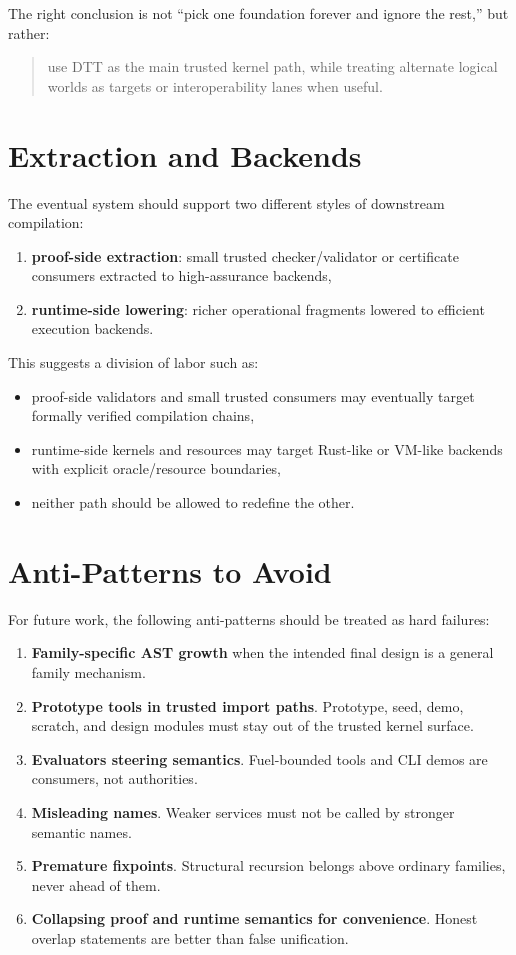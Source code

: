 \documentclass[11pt]{article}
\begin{document}
The right conclusion is not ``pick one foundation forever and ignore the rest,'' but rather:
\begin{quote}
use DTT as the main trusted kernel path, while treating alternate logical worlds as targets or interoperability lanes when useful.
\end{quote}

\section{Extraction and Backends}
The eventual system should support two different styles of downstream compilation:
\begin{enumerate}[label=(\roman*)]
  \item \textbf{proof-side extraction}: small trusted checker/validator or certificate consumers extracted to high-assurance backends,
  \item \textbf{runtime-side lowering}: richer operational fragments lowered to efficient execution backends.
\end{enumerate}

This suggests a division of labor such as:
\begin{itemize}
  \item proof-side validators and small trusted consumers may eventually target formally verified compilation chains,
  \item runtime-side kernels and resources may target Rust-like or VM-like backends with explicit oracle/resource boundaries,
  \item neither path should be allowed to redefine the other.
\end{itemize}

\section{Anti-Patterns to Avoid}
For future work, the following anti-patterns should be treated as hard failures:
\begin{enumerate}[label=(\arabic*)]
  \item \textbf{Family-specific AST growth} when the intended final design is a general family mechanism.
  \item \textbf{Prototype tools in trusted import paths}. Prototype, seed, demo, scratch, and design modules must stay out of the trusted kernel surface.
  \item \textbf{Evaluators steering semantics}. Fuel-bounded tools and CLI demos are consumers, not authorities.
  \item \textbf{Misleading names}. Weaker services must not be called by stronger semantic names.
  \item \textbf{Premature fixpoints}. Structural recursion belongs above ordinary families, never ahead of them.
  \item \textbf{Collapsing proof and runtime semantics for convenience}. Honest overlap statements are better than false unification.
\end{enumerate}
\end{document}

